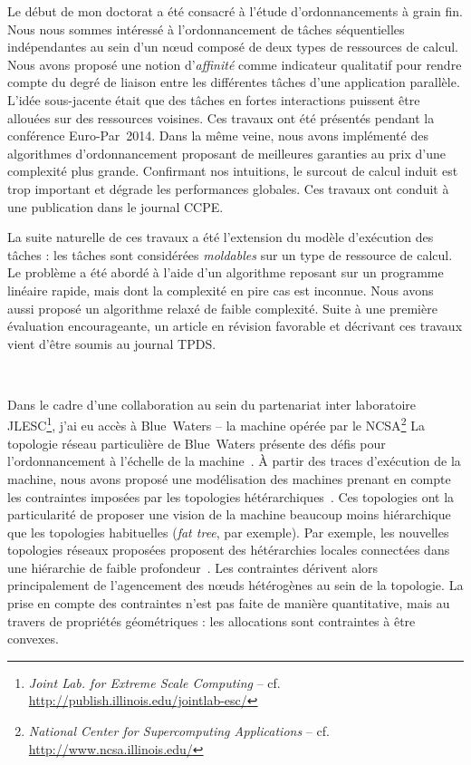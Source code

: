 \documentclass[11pt,final,french]{article}	%
\newcommand{\cf}{cf.}
\begin{document}
Le début de mon doctorat a été consacré à l'étude d'ordonnancements à grain
fin.
%
Nous nous sommes intéressé à l'ordonnancement de tâches séquentielles
indépendantes au sein d'un nœud composé de deux types de ressources de calcul.
%
Nous avons proposé une notion d'\emph{affinité} comme indicateur qualitatif
pour rendre compte du degré de liaison entre les différentes tâches d'une
application parallèle.
%
L'idée sous-jacente était que des tâches en fortes interactions puissent être
allouées sur des ressources voisines.
%
Ces travaux ont été présentés pendant la conférence
Euro-Par~2014\cite{BleuseR2014Scheduling}.
%
Dans la même veine, nous avons implémenté des algorithmes d'ordonnancement
proposant de meilleures garanties au prix d'une complexité plus grande.
%
Confirmant nos intuitions, le surcout de calcul induit est trop important et
dégrade les performances globales.
%
Ces travaux ont conduit à une publication dans le journal
CCPE\cite{BleuseR2015Scheduling}.

La suite naturelle de ces travaux a été l'extension du modèle d'exécution des
tâches : les tâches sont considérées \emph{moldables} sur un type de ressource
de calcul.
%
Le problème a été abordé à l'aide d'un algorithme reposant sur un programme
linéaire rapide, mais dont la complexité en pire cas est inconnue.
%
Nous avons aussi proposé un algorithme relaxé de faible complexité.
%
Suite à une première évaluation encourageante, un article en révision favorable
et décrivant ces travaux vient d'être soumis au journal
TPDS\cite{BleuseR2016Scheduling}.

\

Dans le cadre d'une collaboration au sein du partenariat inter laboratoire
JLESC\footnote{\emph{Joint Lab. for Extreme Scale Computing} -- \cf{}
\url{http://publish.illinois.edu/jointlab-esc/}}, j'ai eu accès à Blue~Waters
-- la machine opérée par le NCSA\(\!\)\footnote{\emph{National Center
for Supercomputing Applications} -- \cf{} \url{http://www.ncsa.illinois.edu/}}
%
La topologie réseau particulière de Blue~Waters présente des défis pour
l'ordonnancement à l'échelle de la machine~\cite{EnosJ2014Topology}.
%
À partir des traces d'exécution de la machine, nous avons proposé une
modélisation des machines prenant en compte les contraintes imposées par les
topologies hétérarchiques~\cite{BleuseR2016Convex}.
%
Ces topologies ont la particularité de proposer une vision de la machine
beaucoup moins hiérarchique que les topologies habituelles (\emph{fat tree},
par exemple).
%
Par exemple, les nouvelles topologies réseaux proposées proposent des
hétérarchies locales connectées dans une hiérarchie de faible
profondeur~\cite{BestaM2014Slim,TuncerO2015PaC}.
%
Les contraintes dérivent alors principalement de l'agencement des nœuds
hétérogènes au sein de la topologie.
%
La prise en compte des contraintes n'est pas faite de manière quantitative,
mais au travers de propriétés géométriques : les allocations sont contraintes à
être convexes.
\end{document}
